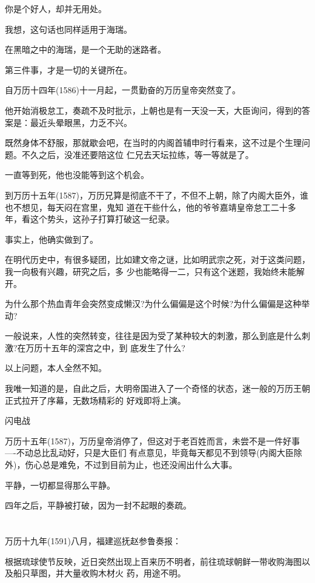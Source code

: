 \documentclass[11pt,a4paper,onecolumn]{article}
\begin{document}
你是个好人，却并无用处。

我想，这句话也同样适用于海瑞。

在黑暗之中的海瑞，是一个无助的迷路者。

第三件事，才是一切的关键所在。

自万历十四年(1586)十一月起，一贯勤奋的万历皇帝突然变了。

他开始消极怠工，奏疏不及时批示，上朝也是有一天没一天，大臣询问，得到的答案是：最近头晕眼黑，力乏不兴。

既然身体不舒服，那就歇会吧，在当时的内阁首辅申时行看来，这不过是个生理问题。不久之后，没准还要陪这位
仁兄去天坛拉练，等一等就是了。

一直等到死，他也没能等到这个机会。

到万历十五年(1587)，万历兄算是彻底不干了，不但不上朝，除了内阁大臣外，谁也不想见，每天闷在宫里，鬼知
道在干些什么，他的爷爷嘉靖皇帝怠工二十多年，看这个势头，这孙子打算打破这一纪录。

事实上，他确实做到了。

在明代历史中，有很多疑团，比如建文帝之谜，比如明武宗之死，对于这类问题，我一向极有兴趣，研究之后，多
少也能略得一二，只有这个迷题，我始终未能解开。

为什么那个热血青年会突然变成懒汉?为什么偏偏是这个时候?为什么偏偏是这种举动?

一般说来，人性的突然转变，往往是因为受了某种较大的刺激，那么到底是什么刺激?在万历十五年的深宫之中，到
底发生了什么?

以上问题，本人全然不知。

我唯一知道的是，自此之后，大明帝国进入了一个奇怪的状态，迷一般的万历王朝正式拉开了序幕，无数场精彩的
好戏即将上演。

闪电战

万历十五年(1587)，万历皇帝消停了，但这对于老百姓而言，未尝不是一件好事----不动总比乱动好，只是大臣们
有点意见，毕竟每天都见不到领导(内阁大臣除外)，伤心总是难免，不过到目前为止，也还没闹出什么大事。

平静，一切都显得那么平静。

四年之后，平静被打破，因为一封不起眼的奏疏。

\section[\thesection]{}

万历十九年(1591)八月，福建巡抚赵参鲁奏报：

根据琉球使节反映，近日突然出现上百来历不明者，前往琉球朝鲜一带收购海图以及船只草图，并大量收购木材火
药，用途不明。
\end{document}
